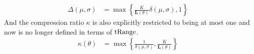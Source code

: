 \begin{equation}\label{eq:newGradient}
\begin{aligned}
\Delta(\mu,\sigma) %
&= \max\left\{ \frac{K}{\mathbf{L}(\theta)}   \delta(\mu,\sigma) , 1 \right\}
\end{aligned}
\end{equation}
And the compression ratio $\kappa$ is also explicitly restricted to being at most one and now is no longer defined in terms of $\text{tRange}$.
\begin{equation}\label{eq:newCompressionRatio}
\begin{aligned}
\kappa(\theta) %
&= \max\left\{ \frac{1}{\delta(\mu,\sigma) }   , \frac{K}{\mathbf{L}(\theta)} \right\}   
\end{aligned}
\end{equation}



